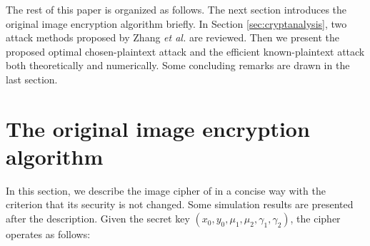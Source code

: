 \documentclass[smallextended, final]{svjour3}          \smartqed
\begin{document}
The rest of this paper is organized as follows. The next section
introduces the original image encryption algorithm briefly.
In Section \ref{sec:cryptanalysis}, two attack methods proposed
by Zhang \textit{et al.} are reviewed. Then we present the proposed optimal
chosen-plaintext attack and the efficient known-plaintext attack both theoretically and numerically.
Some concluding remarks are drawn in the last section.

\section{The original image encryption algorithm}
\label{sec:alogrithm}
In this section, we describe the image cipher of \cite{li2012image} in a concise way with
the criterion that  its security is not changed. Some simulation results are presented after the description.
Given the secret key $(x_0, y_0,\mu_1, \mu_2, \gamma_1, \gamma_2)$,
the cipher operates as follows:
\end{document}
